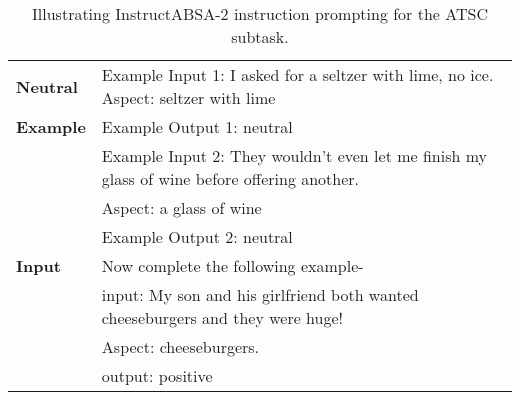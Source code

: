 \documentclass[11pt]{article}
\newcommand{\name}{\textsc{I}nstruct\textsc{ABSA}\xspace}
\begin{document}
\begin{table*}[]
\begin{tabular}{ll}
\textbf{Neutral}                 & Example Input 1: I asked for a seltzer with lime, no ice. Aspect: seltzer with lime \\
\textbf{Example}                 & Example Output 1: neutral                                                         \\
\textbf{}           & Example Input 2: They wouldn't even let me finish my glass of wine before offering another.               \\
                          & Aspect: a glass of wine                                                   \\
\textbf{}                 & Example Output 2: neutral                                                         \\ \hline
\textbf{Input}            & Now complete the following example-                                     \\
\textbf{}           & input: My son and his girlfriend both wanted cheeseburgers and they were huge!                 \\
                          & Aspect: cheeseburgers.                                                  \\
                          & output: positive                                                                \\ \hline
\end{tabular}
\caption{Illustrating \name{}-2 instruction prompting for the ATSC subtask.}
\label{tab:atsc_ip}
\end{table*}
 
\end{document}
